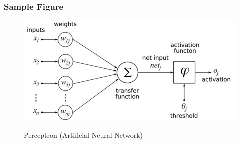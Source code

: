 \documentclass[12pt]{article}
\begin{document}
\subsubsection{Sample Figure}
\begin{figure}[ht!]
 	\centering
 	\caption{Perceptron (Artificial Neural Network)}
 	\includegraphics[width=0.7\linewidth]{images/ANN.jpg}
 	\label{lab:perceptron}
 \end{figure}
\pagebreak





\renewcommand{\bibname}{References} %
\end{document}
